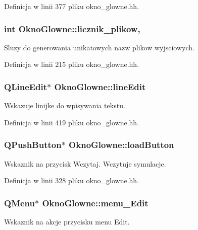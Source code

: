 Definicja w linii 377 pliku okno\-\_\-glowne.\-hh.

\hypertarget{class_okno_glowne_ae615cbd9c9f9ab06b365c4692ff68729}{
\subsubsection[{licznik\-\_\-plikow}]{\setlength{\rightskip}{0pt plus 5cm}int Okno\-Glowne\-::licznik\-\_\-plikow\hspace{0.3cm}{\ttfamily [static]}, {\ttfamily [private]}}}\label{class_okno_glowne_ae615cbd9c9f9ab06b365c4692ff68729}
Sluzy do generowania unikatowych nazw plikow wyjsciowych. 

Definicja w linii 215 pliku okno\-\_\-glowne.\-hh.

\hypertarget{class_okno_glowne_a0112b8be70a26552b03f38fab43a3301}{
\subsubsection[{line\-Edit}]{\setlength{\rightskip}{0pt plus 5cm}Q\-Line\-Edit$\ast$ Okno\-Glowne\-::line\-Edit\hspace{0.3cm}{\ttfamily [private]}}}\label{class_okno_glowne_a0112b8be70a26552b03f38fab43a3301}
Wskazuje linijke do wpisywania tekstu. 

Definicja w linii 419 pliku okno\-\_\-glowne.\-hh.

\hypertarget{class_okno_glowne_accbadc3bc4d418cfe1bce2be61881917}{
\subsubsection[{load\-Button}]{\setlength{\rightskip}{0pt plus 5cm}Q\-Push\-Button$\ast$ Okno\-Glowne\-::load\-Button\hspace{0.3cm}{\ttfamily [private]}}}\label{class_okno_glowne_accbadc3bc4d418cfe1bce2be61881917}
Wskaznik na przycisk Wczytaj. Wczytuje symulacje. 

Definicja w linii 328 pliku okno\-\_\-glowne.\-hh.

\hypertarget{class_okno_glowne_a93afadd0ec22ce6a7e29acc5dd2423a2}{
\subsubsection[{menu\-\_\-\-Edit}]{\setlength{\rightskip}{0pt plus 5cm}Q\-Menu$\ast$ Okno\-Glowne\-::menu\-\_\-\-Edit\hspace{0.3cm}{\ttfamily [private]}}}\label{class_okno_glowne_a93afadd0ec22ce6a7e29acc5dd2423a2}
Wskaznik na akcje przycisku menu Edit. 


